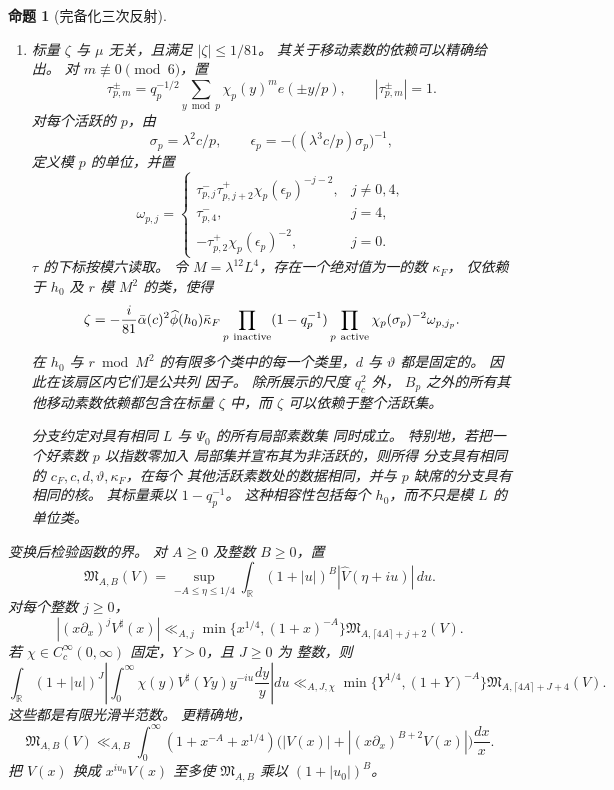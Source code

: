 \documentclass[11pt,a4paper]{article}
\numberwithin{equation}{section}
\numberwithin{figure}{section}
\newtheorem{proposition}[theorem]{命题}
\theoremstyle{definition}
\theoremstyle{remark}
\begin{document}
\begin{proposition}[完备化三次反射]
\begin{enumerate}
\item 标量 $\zeta$ 与 $\mu$ 无关，且满足
$|\zeta|\le1/81$。 其关于移动素数的依赖可以精确给出。
对 $m\not\equiv0\pmod6$，置
\[
 \tau_{p,m}^{\pm}=q_p^{-1/2}\sum_{y\bmod p}\chi_p(y)^m e(\pm y/p),
 \qquad |\tau_{p,m}^{\pm}|=1.
\]
对每个活跃的 $p$，由
\[
 \sigma_p=\lambda^2c/p,\qquad
 \epsilon_p=-\big((\lambda^3c/p)\sigma_p\big)^{-1},
\]
定义模 $p$ 的单位，并置
\[
 \omega_{p,j}=\begin{cases}
 \tau_{p,j}^{-}\tau_{p,j+2}^{+}\chi_p(\epsilon_p)^{-j-2},&j\ne0,4,\\
 \tau_{p,4}^{-},&j=4,\\
 -\tau_{p,2}^{+}\chi_p(\epsilon_p)^{-2},&j=0.
 \end{cases}
\]
$\tau$ 的下标按模六读取。 令
$M=\lambda^{12}L^4$，存在一个绝对值为一的数 $\kappa_F$，
仅依赖于 $h_0$ 及 $r$ 模 $M^2$ 的类，使得
\begin{equation}\label{eq:reflection-row-phase}
 \zeta=-\frac i{81}\bar\alpha(c)^2\widehat\phi(h_0)\bar\kappa_F
 \prod_{p\ {\rm inactive}}(1-q_p^{-1})
 \prod_{p\ {\rm active}}\chi_p(\sigma_p)^{-2}\omega_{p,j_p}.
\end{equation}
在 $h_0$ 与 $r\bmod M^2$ 的有限多个类中的每一个类里，$d$
与 $\vartheta$ 都是固定的。 因此在该扇区内它们是公共列
因子。 除所展示的尺度 $q_c^2$ 外，
$B_p$ 之外的所有其他移动素数依赖都包含在标量
$\zeta$ 中，而 $\zeta$ 可以依赖于整个活跃集。

分支约定对具有相同 $L$ 与 $\Psi_0$ 的所有局部素数集
同时成立。 特别地，若把一个好素数 $p$ 以指数零加入
局部集并宣布其为非活跃的，则所得
分支具有相同的 $c_F,c,d,\vartheta,\kappa_F$，在每个
其他活跃素数处的数据相同，并与 $p$ 缺席的分支具有相同的核。
其标量乘以 $1-q_p^{-1}$。 这种相容性包括每个
$h_0$，而不只是模 $L$ 的单位类。
\end{enumerate}

\emph{变换后检验函数的界。}
对 $A\ge0$ 及整数 $B\ge0$，置
\[
 \mathfrak M_{A,B}(V)=
 \sup_{-A\le\eta\le1/4}\int_{\mathbb R}
       (1+|u|)^B|\widehat V(\eta+iu)|\,du.
\]
对每个整数 $j\ge0$，
\begin{equation}\label{eq:reflection-kernel}
 |(x\partial_x)^jV^\sharp(x)|
 \ll_{A,j}\min\{x^{1/4},(1+x)^{-A}\}
       \mathfrak M_{A,\lceil4A\rceil+j+2}(V).
\end{equation}
若 $\chi\in C_c^\infty(0,\infty)$ 固定，$Y>0$，且 $J\ge0$ 为
整数，则
\begin{equation}\label{eq:reflection-annular-fourier}
 \int_{\mathbb R}(1+|u|)^J
 \left|\int_0^\infty\chi(y)V^\sharp(Yy)y^{-iu}\frac{dy}{y}\right|du
 \ll_{A,J,\chi}\min\{Y^{1/4},(1+Y)^{-A}\}
       \mathfrak M_{A,\lceil4A\rceil+J+4}(V).
\end{equation}
这些都是有限光滑半范数。 更精确地，
\begin{equation}\label{eq:reflection-test-seminorm}
 \mathfrak M_{A,B}(V)\ll_{A,B}
 \int_0^\infty(1+x^{-A}+x^{1/4})
       \bigl(|V(x)|+|(x\partial_x)^{B+2}V(x)|\bigr)\frac{dx}{x}.
\end{equation}
把 $V(x)$ 换成 $x^{iu_0}V(x)$ 至多使
$\mathfrak M_{A,B}$ 乘以 $(1+|u_0|)^B$。
\end{proposition}
\end{document}

